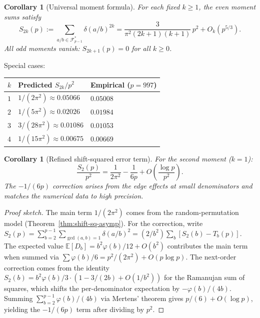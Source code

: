 \documentclass[11pt]{article}
\newtheorem{corollary}[theorem]{Corollary}
\theoremstyle{definition}
\newcommand{\F}{\mathcal{F}}
\begin{document}
\begin{corollary}[Universal moment formula]\label{cor:moments}
For each fixed $k \ge 1$, the even moment sums satisfy
\begin{equation}\label{eq:moment-formula}
  S_{2k}(p) := \sum_{a/b \in \F_{p-1}^*} \delta(a/b)^{2k}
  = \frac{3}{\pi^2(2k+1)(k+1)}\, p^2 + O_k(p^{5/3}).
\end{equation}
All odd moments vanish: $S_{2k+1}(p) = 0$ for all $k \ge 0$.
\end{corollary}

Special cases:
\begin{center}
\begin{tabular}{lll}
\toprule
$k$ & Predicted $S_{2k}/p^2$ & Empirical ($p = 997$) \\
\midrule
$1$ & $1/(2\pi^2) \approx 0.05066$ & $0.05008$ \\
$2$ & $1/(5\pi^2) \approx 0.02026$ & $0.01984$ \\
$3$ & $3/(28\pi^2) \approx 0.01086$ & $0.01053$ \\
$4$ & $1/(15\pi^2) \approx 0.00675$ & $0.00669$ \\
\bottomrule
\end{tabular}
\end{center}

\begin{corollary}[Refined shift-squared error term]\label{cor:refined-error}
For the second moment ($k = 1$):
\begin{equation}\label{eq:refined-error}
  \frac{S_2(p)}{p^2} = \frac{1}{2\pi^2} - \frac{1}{6p}
    + O\!\left(\frac{\log p}{p^2}\right).
\end{equation}
The $-1/(6p)$ correction arises from the edge effects at small
denominators and matches the numerical data to high precision.
\end{corollary}

\begin{proof}[Proof sketch]
The main term $1/(2\pi^2)$ comes from the random-permutation
model (Theorem~\ref{thm:shift-sq-asymp}).  For the correction,
write
$S_2(p) = \sum_{b=2}^{p-1} \sum_{\gcd(a,b)=1} \delta(a/b)^2
= (2/b^2)\sum_b [S_2(b) - T_b(p)]$.
The expected value $\mathbb{E}[D_b] = b^2\varphi(b)/12 + O(b^2)$
contributes the main term when summed via
$\sum \varphi(b)/6 = p^2/(2\pi^2) + O(p\log p)$.
The next-order correction comes from the identity
$S_2(b) = b^2\varphi(b)/3 \cdot (1 - 3/(2b) + O(1/b^2))$
for the Ramanujan sum of squares, which shifts the
per-denominator expectation by $-\varphi(b)/(4b)$.
Summing $\sum_{b=2}^{p-1} \varphi(b)/(4b)$ via Mertens'
theorem gives $p/(6) + O(\log p)$, yielding the $-1/(6p)$ term
after dividing by $p^2$.
\end{proof}
\end{document}
